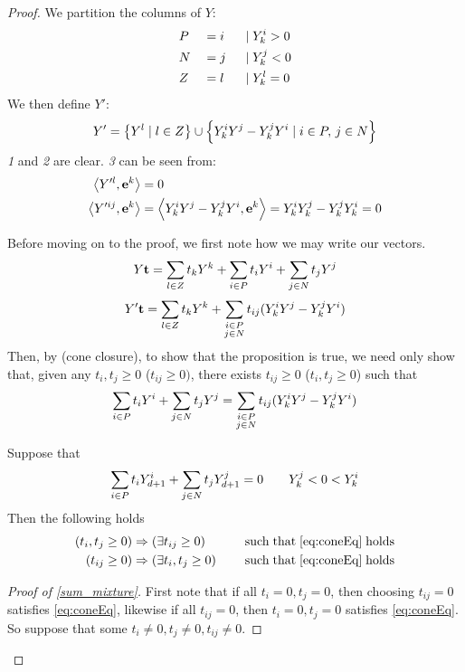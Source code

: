\begin{proof}
	We partition the columns of $ Y$:
	\begin{alignat*}{3}
		 & P &  & = i \; & \;|\; & Y^i_{k} > 0 \\
		 & N &  & = j \; & \;|\; & Y^j_{k} < 0 \\
		 & Z &  & = l \; & \;|\; & Y^l_{k} = 0
	\end{alignat*}
	We then define $ Y'$:
	\[  Y' = \left\{ Y^l \;|\; l \in Z\right\} \cup
		\left\{Y^i_{k} Y^j - Y^j_{k} Y^i \;|\; i \in P,\, j\in N\right\} \]
	\textit{1} and \textit{2} are clear.  \textit{3} can be seen from:
	\begin{align}
		\left\langle Y'^l, \mathbf{e}^k \right\rangle    & = 0 \nonumber                                                                \\
		\left\langle Y'^{ij}, \mathbf{e}^k \right\rangle & = \left\langle Y^i_{k} Y^j - Y^j_{k} Y^i, \mathbf{e}^k \right\rangle = Y^i_{k} Y^j_{k} - Y^j_{k} Y^i_{k} = 0 \label{eq:hdropZrows}
	\end{align}

	Before moving on to the proof, we first note how we may write our vectors.
	\[  Y\mathbf{t} = \sum_{l\in Z} t_k  Y^k + \sum_{i\in P} t_i  Y^i + \sum_{j\in N} t_j  Y^j \]
	\[  Y'\mathbf{t} = \sum_{l\in Z} t_k  Y^k + \sum_{\substack{i\in P \\ j\in N}} t_{ij} (Y^i_{k} Y^j - Y^j_{k} Y^i) \]
	Then, by  (cone closure), to show that the proposition is true, we need only show that, given any $t_i, t_j \geq 0$ ($t_{ij} \geq 0)$, there exists $t_{ij} \geq 0$ ($t_i, t_j \geq 0$) such that
	\begin{equation} \label{eq:coneEq}
		\sum_{i\in P} t_i  Y^i + \sum_{j\in N} t_j  Y^j = \sum_{\substack{i\in P \\ j\in N}} t_{ij} (Y^i_{k} Y^j - Y^j_{k} Y^i)
	\end{equation}

	\newcommand{\coneEqSat}{\quad\mathrm{\;such\; that\; \eqref{eq:coneEq}\; holds}}
	\begin{Prop}\label{sum_mixture}
		Suppose that
		\[ \sum_{i\in P} t_i  Y^i_{d+1} + \sum_{j\in N} t_j  Y^j_{d+1} = 0\quad\quad Y^j_{k} < 0 < Y^i_{k} \]
		Then the following holds
		\begin{alignat*}{2}
			(t_i, t_j \geq 0) & \Rightarrow (\exists t_{ij} \geq 0)   &  & \coneEqSat \\
			(t_{ij} \geq 0)   & \Rightarrow (\exists t_i, t_j \geq 0) &  & \coneEqSat
		\end{alignat*}
	\end{Prop}

	\begin{proof}[Proof of \cref{sum_mixture}]
		First note that if all $t_i = 0,t_j = 0$, then choosing $t_{ij} = 0$ satisfies \eqref{eq:coneEq}, likewise if all $t_{ij} = 0$, then $t_i = 0, t_j = 0$ satisfies \eqref{eq:coneEq}.  So suppose that some $t_i \neq 0, t_j \neq 0, t_{ij} \neq 0$.


\end{proof}
\end{proof}
